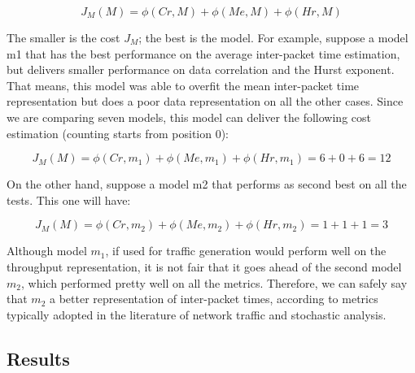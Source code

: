 \begin{equation}
\label{eq:cost-function}
J_M(M) = \phi(Cr, M) + \phi(Me, M) + \phi(Hr, M)
\end{equation}

The smaller is the cost $J_M$; the best is the model. For example, suppose a model m1 that has the best performance on the average inter-packet time estimation, but delivers smaller performance on data correlation and the Hurst exponent. That means, this model was able to overfit the mean inter-packet time representation but does a poor data representation on all the other cases. Since we are comparing seven models, this model can deliver the following cost estimation (counting starts from position 0):

\begin{equation}
\label{eq:cost-function-ex1}
J_M(M) = \phi(Cr, m_1) + \phi(Me, m_1) + \phi(Hr, m_1) = 6 + 0 + 6 = 12
\end{equation}

On the other hand, suppose a model m2 that performs as second best on all the tests. This one will have:

\begin{equation}
\label{eq:cost-function-ex2}
J_M(M) = \phi(Cr, m_2) + \phi(Me, m_2) + \phi(Hr, m_2) = 1 + 1 + 1 = 3
\end{equation}

Although model $m_1$, if used for traffic generation would perform well on the throughput representation, it is not fair that it goes ahead of the second model $m_2$, which performed pretty well on all the metrics. Therefore, we can safely say that  $m_2$ a better representation of inter-packet times, according to metrics typically adopted in the literature of network traffic and stochastic analysis. 


\subsection{Results}



